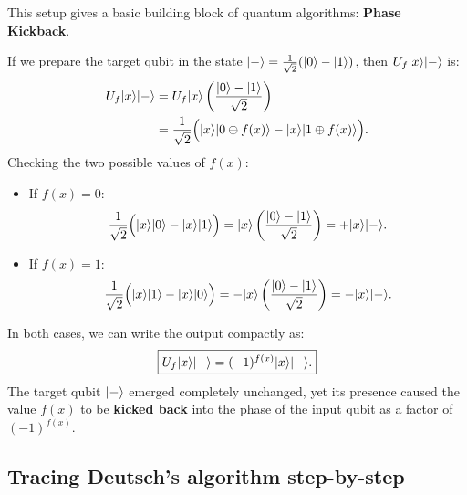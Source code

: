 This setup gives a basic building block of quantum algorithms:
\textbf{Phase Kickback}.

If we prepare the target qubit in the state $\lvert - \rangle = \frac{1}{\sqrt{2}}(\lvert 0 \rangle - \lvert 1 \rangle)$, then $U_f \lvert x \rangle\lvert - \rangle$ is:
\begin{align*}
  U_f \lvert x \rangle\lvert - \rangle &= U_f \lvert x \rangle\left(\frac{\lvert 0 \rangle - \lvert 1 \rangle}{\sqrt{2}}\right) \\
  &= \frac{1}{\sqrt{2}}\Big(\lvert x \rangle\lvert 0 \oplus f(x) \rangle - \lvert x \rangle\lvert 1 \oplus f(x) \rangle\Big).
\end{align*}
Checking the two possible values of $f(x)$:
\begin{itemize}
  \item If $f(x) = 0$:
  \[
    \frac{1}{\sqrt{2}}\Big(\lvert x \rangle\lvert 0 \rangle - \lvert x \rangle\lvert 1 \rangle\Big)
    = \lvert x \rangle\left(\frac{\lvert 0 \rangle - \lvert 1 \rangle}{\sqrt{2}}\right) = +\lvert x \rangle\lvert - \rangle.
  \]
  \item If $f(x) = 1$:
  \[
    \frac{1}{\sqrt{2}}\Big(\lvert x \rangle\lvert 1 \rangle - \lvert x \rangle\lvert 0 \rangle\Big)
    = -\lvert x \rangle\left(\frac{\lvert 0 \rangle - \lvert 1 \rangle}{\sqrt{2}}\right) = -\lvert x \rangle\lvert - \rangle.
  \]
\end{itemize}
In both cases, we can write the output compactly as:
\[
  \boxed{U_f \lvert x \rangle\lvert - \rangle = (-1)^{f(x)}\lvert x \rangle\lvert - \rangle.}
\]
The target qubit $\lvert - \rangle$ emerged completely unchanged, yet its presence caused the value
$f(x)$ to be \textbf{kicked back} into the phase of the input qubit as a factor of $(-1)^{f(x)}$.

\subsection{Tracing Deutsch's algorithm step-by-step}

